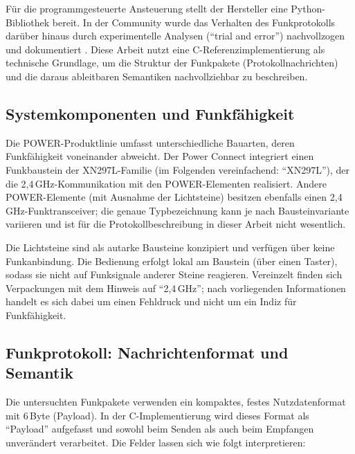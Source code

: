Für die programmgesteuerte Ansteuerung stellt der Hersteller eine Python-Bibliothek bereit.
In der Community wurde das Verhalten des Funkprotokolls darüber hinaus durch experimentelle Analysen (\enquote{trial and error}) nachvollzogen und dokumentiert \cite{mikrocontroller2024gravitraxfunkfrequenz}.
Diese Arbeit nutzt eine C-Referenzimplementierung \cite{github2025alramlechnerGTProtocol} als technische Grundlage, um die Struktur der Funkpakete (Protokollnachrichten) und die daraus ableitbaren Semantiken nachvollziehbar zu beschreiben.

\subsection{Systemkomponenten und Funkfähigkeit}
Die POWER-Produktlinie umfasst unterschiedliche Bauarten, deren Funkfähigkeit voneinander abweicht.
Der Power Connect integriert einen Funkbaustein der XN297L-Familie (im Folgenden vereinfachend: \enquote{XN297L}), der die 2{,}4\,GHz-Kommunikation mit den POWER-Elementen realisiert.
Andere POWER-Elemente (mit Ausnahme der Lichtsteine) besitzen ebenfalls einen 2{,}4\,GHz-Funktransceiver; die genaue Typbezeichnung kann je nach Bausteinvariante variieren und ist für die Protokollbeschreibung in dieser Arbeit nicht wesentlich.

Die Lichtsteine sind als autarke Bausteine konzipiert und verfügen über keine Funkanbindung.
Die Bedienung erfolgt lokal am Baustein (über einen Taster), sodass sie nicht auf Funksignale anderer Steine reagieren.
Vereinzelt finden sich Verpackungen mit dem Hinweis auf \enquote{2{,}4\,GHz}; nach vorliegenden Informationen handelt es sich dabei um einen Fehldruck und nicht um ein Indiz für Funkfähigkeit.

\subsection{Funkprotokoll: Nachrichtenformat und Semantik}
Die untersuchten Funkpakete verwenden ein kompaktes, festes Nutzdatenformat mit 6\,Byte (Payload).
In der C-Implementierung wird dieses Format als \enquote{Payload} aufgefasst und sowohl beim Senden als auch beim Empfangen unverändert verarbeitet.
Die Felder lassen sich wie folgt interpretieren:


